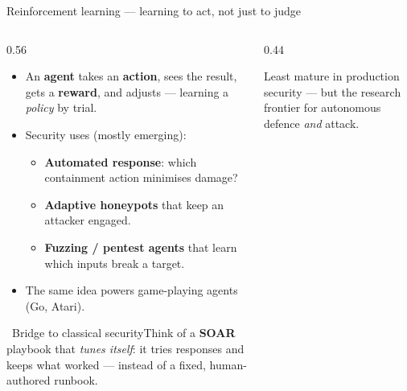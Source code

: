 \documentclass[aspectratio=169,10pt]{beamer}
\newcommand{\term}[1]{{\color{mlink}\textbf{#1}}}         %
\newcommand{\bridge}[1]{%
  \begin{block}{\small\ding{43}\ Bridge to classical security}\small #1\end{block}}
\begin{document}
\begin{frame}{Reinforcement learning --- learning to act, not just to judge}
  \begin{columns}[T]
    \begin{column}{0.56\textwidth}
      \begin{itemize}
        \item An \term{agent} takes an \term{action}, sees the result, gets a
              \term{reward}, and adjusts --- learning a \emph{policy} by trial.
        \item Security uses (mostly emerging):
        \begin{itemize}
          \item \term{Automated response}: which containment action minimises
                damage?
          \item \term{Adaptive honeypots} that keep an attacker engaged.
          \item \term{Fuzzing / pentest agents} that learn which inputs break a
                target.
        \end{itemize}
        \item The same idea powers game-playing agents (Go, Atari).
      \end{itemize}
      \bridge{Think of a \term{SOAR} playbook that \emph{tunes itself}: it tries
      responses and keeps what worked --- instead of a fixed, human-authored
      runbook.}
    \end{column}
    \begin{column}{0.44\textwidth}
      \centering
      \par\vspace{0.4em}
      {\footnotesize\color{midgray}Least mature in production security --- but the
      research frontier for autonomous defence \emph{and} attack.}
    \end{column}
  \end{columns}
\end{frame}
\end{document}
